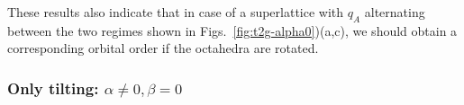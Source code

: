 \documentclass[a4paper,prb,twocolumn]{revtex4-1}  %
\newcommand{\com}[1]{}
\begin{document}
These results also indicate that in case of a superlattice with $q_A$ alternating
between the two regimes shown in Figs.~\ref{fig:t2g-alpha0})(a,c),
we should obtain a corresponding orbital order if the octahedra are rotated.





\com{
$\eta=\left(\frac{a\Delta_{O}}{q_o}\right)=\frac{4}{15}$
at $D_4=1/200$\\
$a=7$ bohr, and $\braket{r^4}=11.5809$ gives $2eV$ crystal field gap: $D_4=11.5809/a^4=0.004823365264473\simeq0.005=1/200=5\times10^{-3}$,
$D_2=\sqrt{D4}=0.0694503$,
$D_2/D_4\simeq 14$.
}
\com{$D_2/D_4$ ranges between $15$-$20$ for typical gaps of $2$-$1$ eV and $a\simeq 7$ bohr (and $q_o=2e$). 
It decreases with increasing gap as $1/\sqrt(gap)$, but is still $10$ at $gap=3.5$eV.
}






\subsubsection{Only tilting: $\alpha\neq 0,\beta = 0$}
\label{sec:t2g-beta0}
\end{document}
